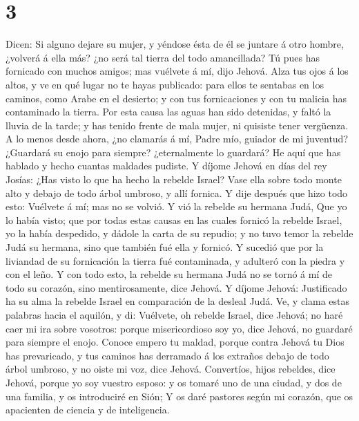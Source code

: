 \hypertarget{section-2}{%
\section{3}\label{section-2}}

 Dicen: Si alguno dejare su mujer, y yéndose ésta de él se
juntare á otro hombre, ¿volverá á ella más? ¿no será tal tierra del todo
amancillada? Tú pues has fornicado con muchos amigos; mas vuélvete á mí,
dijo Jehová.  Alza tus ojos á los altos, y ve en qué lugar
no te hayas publicado: para ellos te sentabas en los caminos, como Arabe
en el desierto; y con tus fornicaciones y con tu malicia has contaminado
la tierra.  Por esta causa las aguas han sido detenidas, y
faltó la lluvia de la tarde; y has tenido frente de mala mujer, ni
quisiste tener vergüenza.  A lo menos desde ahora, ¿no
clamarás á mí, Padre mío, guiador de mi juventud?  ¿Guardará
su enojo para siempre? ¿eternalmente lo guardará? He aquí que has
hablado y hecho cuantas maldades pudiste.  Y díjome Jehová
en días del rey Josías: ¿Has visto lo que ha hecho la rebelde Israel?
Vase ella sobre todo monte alto y debajo de todo árbol umbroso, y allí
fornica.  Y dije después que hizo todo esto: Vuélvete á mí;
mas no se volvió. Y vió la rebelde su hermana Judá,  Que yo
lo había visto; que por todas estas causas en las cuales fornicó la
rebelde Israel, yo la había despedido, y dádole la carta de su repudio;
y no tuvo temor la rebelde Judá su hermana, sino que también fué ella y
fornicó.  Y sucedió que por la liviandad de su fornicación
la tierra fué contaminada, y adulteró con la piedra y con el leño.
 Y con todo esto, la rebelde su hermana Judá no se tornó á
mí de todo su corazón, sino mentirosamente, dice Jehová.  Y
díjome Jehová: Justificado ha su alma la rebelde Israel en comparación
de la desleal Judá.  Ve, y clama estas palabras hacia el
aquilón, y di: Vuélvete, oh rebelde Israel, dice Jehová; no haré caer mi
ira sobre vosotros: porque misericordioso soy yo, dice Jehová, no
guardaré para siempre el enojo.  Conoce empero tu maldad,
porque contra Jehová tu Dios has prevaricado, y tus caminos has
derramado á los extraños debajo de todo árbol umbroso, y no oiste mi
voz, dice Jehová.  Convertíos, hijos rebeldes, dice Jehová,
porque yo soy vuestro esposo: y os tomaré uno de una ciudad, y dos de
una familia, y os introduciré en Sión;  Y os daré pastores
según mi corazón, que os apacienten de ciencia y de inteligencia.
